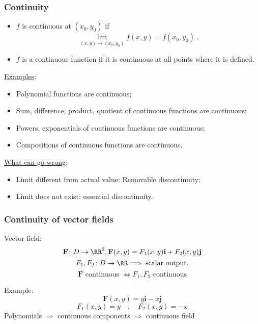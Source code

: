 \begin{frame}
  \frametitle{Continuity}

\begin{itemize}
  \item $f$ is continuous at $(x_0,y_0)$ if
%
$$\lim_{(x,y) \to (x_0,y_0)} f(x,y) = f(x_0,y_0) \; .$$

\item $f$ is a continuous function if it is continuous at all points where it is defined.
\end{itemize}

\pause
\underline{Examples}:
%
\begin{itemize}
  \item Polynomial functions are continuous;
  \item Sum, difference, product, quotient of continuous functions are continuous;
  \item Powers, exponentials of continuous functions are continuous;
  \item Compositions of continuous functions are continuous.
\end{itemize}

\pause
\underline{What can go wrong}:
\begin{itemize}
  \item Limit different from actual value: Removable discontinuity:
  \item Limit does not exist: essential discontinuity.
\end{itemize}
\end{frame}

\begin{frame}
  \frametitle{Continuity of vector fields}

  Vector field:
  $$\textbf{F}\colon D \to \RR^2, \textbf{F}(x,y) = F_1(x,y) \textbf{i} + F_2(x,y) \textbf{j} $$
  $$F_1, F_2 \colon D \to \RR \Longrightarrow \text{ scalar output.}$$
  $$\textbf{F} \text{ continuous } \Longleftrightarrow F_1, F_2 \text{ continuous}$$

  \pause
  Example:
  $$\textbf{F}(x,y) = y \textbf{i} -x\textbf{j}$$
  $$F_1(x,y) = y \quad , \quad F_2(x,y) = -x $$
  Polynomials $\Longrightarrow$ continuous components $\Longrightarrow$ continuous field
\end{frame}

